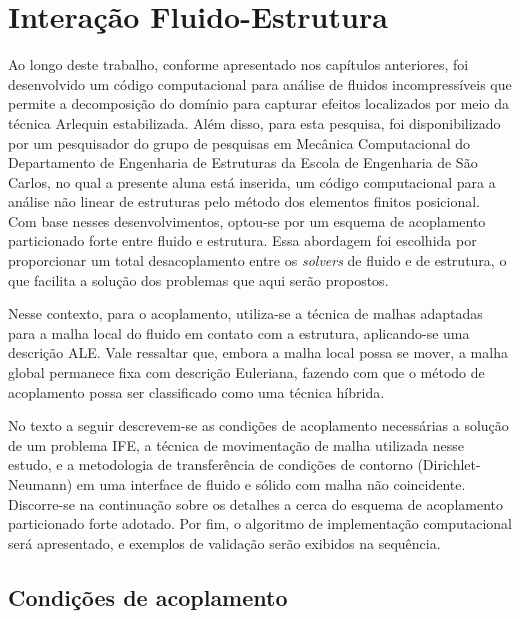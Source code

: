 \documentclass[tese_patricia]{subfiles}
\begin{document}
\chapter[Acoplamento Fluido-Estrutura]{Interação Fluido-Estrutura} \label{capitulo:Cap7}


Ao longo deste trabalho, conforme apresentado nos capítulos anteriores, foi desenvolvido um código computacional para análise de fluidos incompressíveis que permite a decomposição do domínio para capturar efeitos localizados por meio da técnica Arlequin estabilizada. Além disso, para esta pesquisa, foi disponibilizado por um pesquisador do grupo de pesquisas em Mecânica Computacional do Departamento de Engenharia de Estruturas da Escola de Engenharia de São Carlos, no qual a presente aluna está inserida, um código computacional para a análise não linear de estruturas pelo método dos elementos finitos posicional. Com base nesses desenvolvimentos, optou-se por um esquema de acoplamento particionado forte entre fluido e estrutura. Essa abordagem foi escolhida por proporcionar um total desacoplamento entre os \textit{solvers} de fluido e de estrutura, o que facilita a solução dos problemas que aqui serão propostos.

Nesse contexto, para o acoplamento, utiliza-se a técnica de malhas adaptadas para a malha local do fluido em contato com a estrutura, aplicando-se uma descrição ALE. Vale ressaltar que, embora a malha local possa se mover, a malha global permanece fixa com descrição Euleriana, fazendo com que o método de acoplamento possa ser classificado como uma técnica híbrida.
 
No texto a seguir descrevem-se as condições de acoplamento necessárias a solução de um problema IFE, a técnica de movimentação de malha utilizada nesse estudo, e a metodologia de transferência de condições de contorno (Dirichlet-Neumann) em uma interface de fluido e sólido com malha não coincidente. Discorre-se na continuação sobre os detalhes a cerca do esquema de acoplamento particionado forte adotado. Por fim, o algoritmo de implementação computacional será apresentado, e exemplos de validação serão exibidos na sequência.

\section{Condições de acoplamento}
\end{document}
